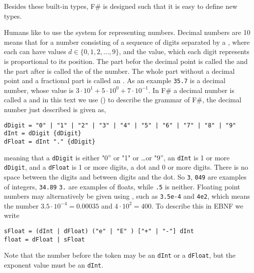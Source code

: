 Besides these built-in types, F\# is designed such that it is easy to define new types. 

Humans like to use the  system for representing numbers. Decimal numbers are  10 means that for a number consisting of a sequence of digits separated by a , where each  can have values $d \in \{0,1,2,\ldots,9\}$, and the value, which each digit represents is proportional to its position. The part befor the decimal point is called the  and the part after is called the  of the number. The whole part without a decimal point and a fractional part is called an . As an example \lstinline!35.7! is a decimal number, whose value is $3\cdot 10^1+5\cdot 10^0+7\cdot 10^{-1}$. In F\# a decimal number is called a  and in this text we use  () to describe the grammar of F\#, the decimal number just described is given as,
%
\begin{lstlisting}[language=ebnf]
dDigit = "0" | "1" | "2" | "3" | "4" | "5" | "6" | "7" | "8" | "9"
dInt = dDigit {dDigit}
dFloat = dInt "." {dDigit}
\end{lstlisting}
%
meaning that a \lstinline[language=ebnf]!dDigit! is either "0'' or "1" or \dots or "9'', an \lstinline[language=ebnf]!dInt! is 1 or more \lstinline[language=ebnf]!dDigit!, and a \lstinline[language=ebnf]!dFloat! is 1 or more digits, a dot and 0 or more digits. There is no space between the digits and between digits and the dot. So \lstinline!3!, \lstinline!049! are examples of integers, \lstinline!34.89! \lstinline!3.! are examples of floats, while \lstinline!.5! is neither.  Floating point numbers may alternatively be given using , such as \lstinline!3.5e-4! and \lstinline!4e2!, which means the number $3.5\cdot 10^{-4} = 0.00035$ and $4\cdot 10^2=400$. To describe this in EBNF we write
%
\begin{lstlisting}[language=ebnf]
sFloat = (dInt | dFloat) ("e" | "E" ) ["+" | "-"] dInt
float = dFloat | sFloat
\end{lstlisting}
%
Note that the number before the token  may be an \lstinline[language=ebnf]!dInt! or a \lstinline[language=ebnf]!dFloat!, but the exponent value must be an \lstinline[language=ebnf]!dInt!.

